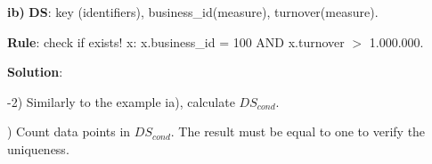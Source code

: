 \begin{table}
\begin{center}
\footnotesize
{}
\caption{Translation of example ia)}
\centering
\label{Tab1-1}
\end{center}
\end{table}


\bigskip\noindent
\textbf{ib)} \textbf{DS}: key (identifiers), business\_id(measure), turnover(measure). 

\bigskip\noindent
\textbf{Rule}: check if exists! x: x.business\_id = 100 AND x.turnover $>$ 1.000.000.

\bigskip\noindent
\textbf{Solution}:

-2) Similarly to the example ia), calculate $  DS_{cond} $. 

) Count data points in $  DS_{cond}  $. The result must be equal to one to verify the uniqueness.

\bigskip
%
%
%
%




